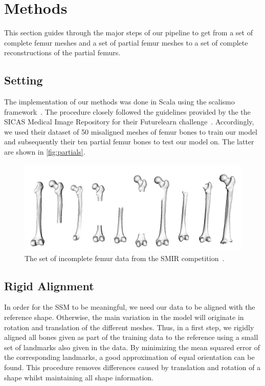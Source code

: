 \section{Methods}
\label{sec:methods}

This section guides through the major steps of our pipeline to get from a set of complete femur meshes and a set of partial femur meshes to a set of complete reconstructions of the partial femurs.


\subsection{Setting}
\label{subsec:setting}

The implementation of our methods was done in Scala using the scalismo framework~\cite{scalismo}.
The procedure closely followed the guidelines provided by the the SICAS Medical Image Repository for their Futurelearn challenge~\cite{smir}. 
Accordingly, we used their dataset of 50 misaligned meshes of femur bones to train our model and subsequently their ten partial femur bones to test our model on.
The latter are shown in \autoref{fig:partials}.

\begin{figure}
	\centering
  \includegraphics[width=.8\textwidth]{./Figures/partial_summary}
  \caption{The set of incomplete femur data from the SMIR competition~\cite{smir}.}
  \label{fig:partials}
\end{figure}


\subsection{Rigid Alignment}
\label{subsec:rigid}

In order for the SSM to be meaningful, we need our data to be aligned with the reference shape.
Otherwise, the main variation in the model will originate in rotation and translation of the different meshes.
Thus, in a first step, we rigidly aligned all bones given as part of the training data to the reference using a small set of landmarks also given in the data.
By minimizing the mean squared error of the corresponding landmarks, a good approximation of equal orientation can be found.
This procedure removes differences caused by translation and rotation of a shape whilst maintaining all shape information.

